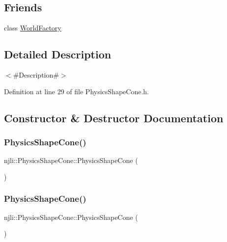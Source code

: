 \subsection*{Friends}
\begin{DoxyCompactItemize}
\item 
class \mbox{\hyperlink{classnjli_1_1_physics_shape_cone_acb96ebb09abe8f2a37a915a842babfac}{World\+Factory}}
\end{DoxyCompactItemize}


\subsection{Detailed Description}
$<$\#\+Description\#$>$ 

Definition at line 29 of file Physics\+Shape\+Cone.\+h.



\subsection{Constructor \& Destructor Documentation}
\mbox{\label{classnjli_1_1_physics_shape_cone_ac6a158806b78bae84ee7cc425d246ce8}} 
\subsubsection{\texorpdfstring{Physics\+Shape\+Cone()}{PhysicsShapeCone()}\hspace{0.1cm}{\footnotesize\ttfamily [1/3]}}
{\footnotesize\ttfamily njli\+::\+Physics\+Shape\+Cone\+::\+Physics\+Shape\+Cone (\begin{DoxyParamCaption}{ }\end{DoxyParamCaption})\hspace{0.3cm}{\ttfamily [protected]}}

\mbox{\label{classnjli_1_1_physics_shape_cone_a4e3d15653670e4817d297dbfc777abb9}} 
\subsubsection{\texorpdfstring{Physics\+Shape\+Cone()}{PhysicsShapeCone()}\hspace{0.1cm}{\footnotesize\ttfamily [2/3]}}
{\footnotesize\ttfamily njli\+::\+Physics\+Shape\+Cone\+::\+Physics\+Shape\+Cone (\begin{DoxyParamCaption}\item[{const \mbox{\hyperlink{classnjli_1_1_abstract_builder}{Abstract\+Builder}} \&}]{ }\end{DoxyParamCaption})\hspace{0.3cm}{\ttfamily [protected]}}

